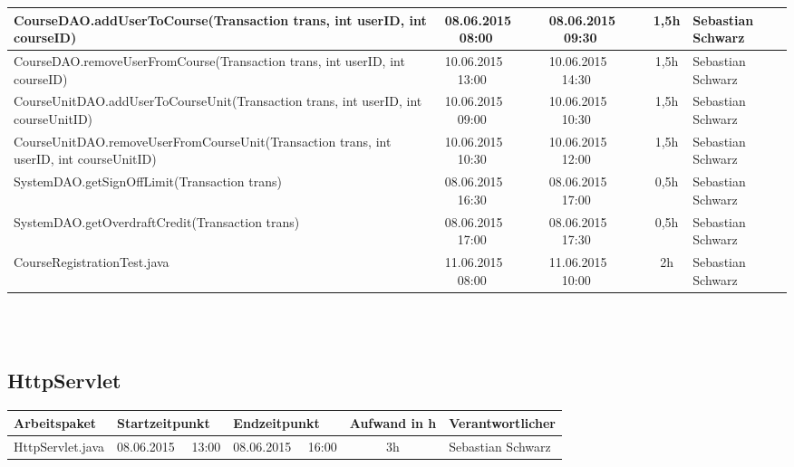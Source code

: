 \begin{landscape}
\begin{tabular}{|p{10.3cm}|p{3.2cm}|p{3.2cm}|c|p{3.5cm}|}
		\hline   CourseDAO.addUserToCourse(Transaction trans, int userID, int courseID)            & 08.06.2015 \ \ 08:00       & 08.06.2015 \ \ 09:30        & 1,5h                 & Sebastian Schwarz\\
		\hline   CourseDAO.removeUserFromCourse(Transaction trans, int userID, int courseID)       & 10.06.2015 \ \ 13:00       & 10.06.2015 \ \ 14:30        & 1,5h                 & Sebastian Schwarz\\
		\hline   CourseUnitDAO.addUserToCourseUnit(Transaction trans, int userID, int courseUnitID)& 10.06.2015 \ \ 09:00       & 10.06.2015 \ \ 10:30        & 1,5h                 & Sebastian Schwarz\\
		\hline   CourseUnitDAO.removeUserFromCourseUnit(Transaction trans, int userID, int courseUnitID) & 10.06.2015 \ \ 10:30       & 10.06.2015 \ \ 12:00        & 1,5h                 & Sebastian Schwarz\\
		\hline   SystemDAO.getSignOffLimit(Transaction trans)                 & 08.06.2015 \ \ 16:30       & 08.06.2015 \ \ 17:00        & 0,5h                 & Sebastian Schwarz\\
		\hline   SystemDAO.getOverdraftCredit(Transaction trans)              & 08.06.2015 \ \ 17:00       & 08.06.2015 \ \ 17:30        & 0,5h                 & Sebastian Schwarz\\
		\hline   CourseRegistrationTest.java &  11.06.2015 \ \ 08:00       & 11.06.2015 \ \ 10:00       & 2h                 & Sebastian Schwarz\\
		\hline 
	\end{tabular} \ \\
	\ \\
	
	\subsection{HttpServlet}
	\begin{tabular}{|p{10.3cm}|p{3.2cm}|p{3.2cm}|c|p{3.5cm}|}
		\hline  \textbf{Arbeitspaket} & \textbf{Startzeitpunkt} & \textbf{Endzeitpunkt} & \textbf{Aufwand in h} & \textbf{Verantwortlicher} \\ 
		\hline   HttpServlet.java         & 08.06.2015 \ \ 13:00       & 08.06.2015 \ \ 16:00        & 3h                 & Sebastian Schwarz\\
		\hline 
	\end{tabular} \ \\
	\ \\
	

\end{landscape}
